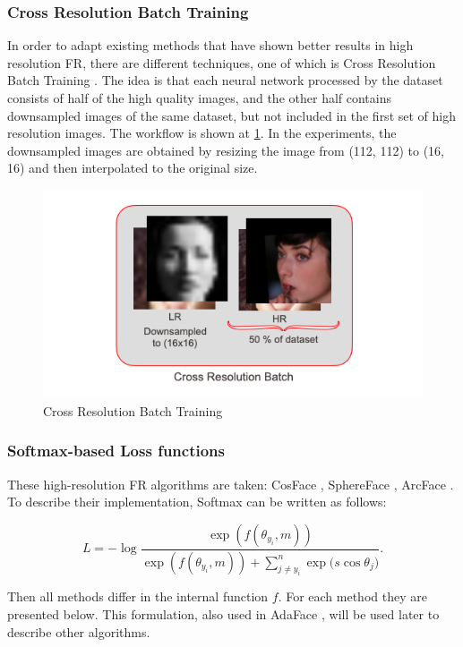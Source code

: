 \documentclass[11pt,a4paper]{article}
\begin{document}
\subsubsection{Cross Resolution Batch Training}
In order to adapt existing methods that have shown better results in high resolution FR, there are different techniques, one of which is Cross Resolution Batch Training \cite{Susceptibility}. The idea is that each neural network processed by the dataset consists of half of the high quality images, and the other half contains downsampled images of the same dataset, but not included in the first set of high resolution images. The workflow is shown at \ref{fig:cross_resolution}. In the experiments, the downsampled images are obtained by resizing the image from (112, 112) to (16, 16) and then interpolated to the original size. 

\begin{figure}[ht!]
    \centering
    \includegraphics[width=\textwidth]{CR_batch.png}
    \caption{Cross Resolution Batch Training}
    \label{fig:cross_resolution}
\end{figure}

\subsubsection{Softmax-based Loss functions} 
These high-resolution FR algorithms are taken: CosFace \cite{cosface}, SphereFace \cite{sphereface}, ArcFace \cite{arcface}. To describe their implementation, Softmax \cite{softmax} can be written as follows:

$$L = - \log \frac {\exp(f(\theta_{y_i}, m))} {\exp(f(\theta_{y_i}, m)) + \sum_{j \neq y_i}^n{\exp(s \cos \theta_j})}.$$

Then all methods differ in the internal function $f$. For each method they are presented below. This formulation, also used in AdaFace \cite{adaface}, will be used later to describe other algorithms. 
\end{document}
